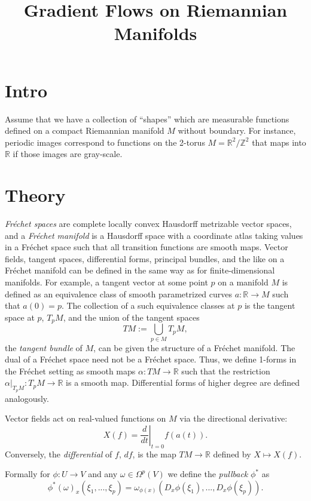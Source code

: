 \documentclass{article}
\title{Gradient Flows on Riemannian Manifolds}
\theoremstyle{plain}
\theoremstyle{definition}
\newcommand{\Z}{\ensuremath{\mathbb{Z}}}
\newcommand{\R}{\ensuremath{\mathbb{R}}}
\begin{document}
\maketitle 
\tableofcontents

\section{Intro}
Assume that we have a collection of ``shapes'' which are measurable functions defined on a compact Riemannian manifold $M$ without boundary. For instance, periodic images correspond to functions on the 2-torus $M=\R^2/\Z^2$ that maps into $\R$ if those images are gray-scale.



\section{Theory}
\textit{Fréchet spaces} are complete locally convex Hausdorff metrizable vector spaces, and a \textit{Fréchet manifold} is a Hausdorff space with a coordinate atlas taking values in a Fréchet space such that all transition functions are smooth maps. Vector fields, tangent spaces, differential forms, principal bundles, and the like on a Fréchet manifold can be defined in the same way as for finite-dimensional manifolds. For example, a tangent vector at some point $p$ on a manifold $M$ is defined as an equivalence class of smooth parametrized curves $a:\R\to M$ such that $a(0)=p$. The collection of a such equivalence classes at $p$ is the tangent space at $p$, $T_pM$, and the union of the tangent spaces
\[
TM:=\bigcup_{p\in M}T_pM,
\]
the \textit{tangent bundle} of $M$, can be given the structure of a Fréchet manifold. The dual of a Fréchet space need not be a Fréchet space. Thus, we define 1-forms in the Fréchet setting as smooth maps $\alpha: TM\to\R$ such that the restriction $\alpha|_{T_pM}:T_pM\to\R$ is a smooth map. Differential forms of higher degree are defined analogously.

Vector fields act on real-valued functions on $M$ via the directional derivative:
\[
  X(f)=\left.\frac{d}{dt}\right|_{t=0} f(a(t)).
\]
Conversely, the \textit{differential} of $f$, $df$, is the map $TM\to \R$ defined by $X\mapsto X(f)$.

Formally for $\phi: U\to V$ and any $\omega\in \Omega^p(V)$ we define the \textit{pullback} $\phi^*$ as
\[
 \phi^*(\omega)_x(\xi_1,...,\xi_p)=\omega_{\phi(x)}\left(D_x\phi(\xi_1),...,D_x\phi(\xi_p)\right).
\]
\end{document}
